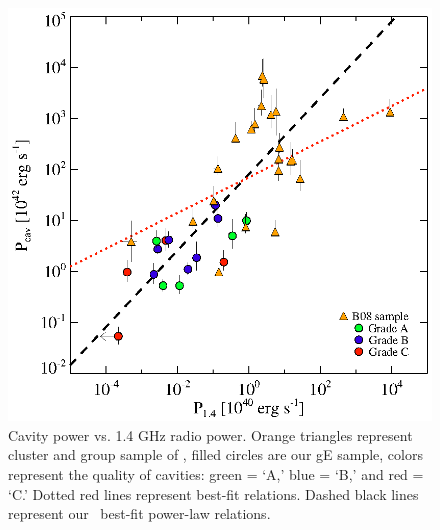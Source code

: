 \documentclass[letterpaper,12pt]{article}
\begin{document}
\begin{figure}[t]
    \begin{minipage}[t]{0.5\linewidth}
        \centering
        \includegraphics*[width=\textwidth, trim=30mm 5mm 40mm 15mm, clip]{pjet.eps}
        \caption{\footnotesize Cavity power vs. 1.4 GHz radio
          power. Orange triangles represent cluster and group sample
          of \citep{birzan08}, filled circles are our gE sample,
          colors represent the quality of cavities: green = `A,' blue
          = `B,' and red = `C.' Dotted red lines represent
          \citep{birzan08} best-fit relations. Dashed black lines
          represent our \bces\ best-fit power-law relations.}
        \label{fig:pjet}
    \end{minipage}
\end{figure}


\end{document}
